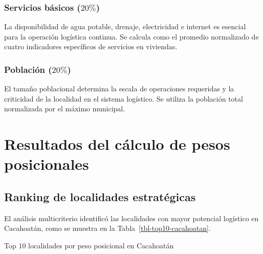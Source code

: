 \documentclass[
  spanish,
  us-letterpaper,
]{scrreprt}
\numberwithin{equation}{section}
\begin{document}
\subsubsection{\texorpdfstring{Servicios básicos
(\(20\%\))}{Servicios básicos (20\textbackslash\%)}}\label{servicios-buxe1sicos-20}

La disponibilidad de agua potable, drenaje, electricidad e internet es
esencial para la operación logística continua. Se calcula como el
promedio normalizado de cuatro indicadores específicos de servicios en
viviendas.

\subsubsection{\texorpdfstring{Población
(\(20\%\))}{Población (20\textbackslash\%)}}\label{poblaciuxf3n-20}

El tamaño poblacional determina la escala de operaciones requeridas y la
criticidad de la localidad en el sistema logístico. Se utiliza la
población total normalizada por el máximo municipal.

\section{Resultados del cálculo de pesos
posicionales}\label{resultados-del-cuxe1lculo-de-pesos-posicionales}

\subsection{Ranking de localidades
estratégicas}\label{ranking-de-localidades-estratuxe9gicas}

El análisis multicriterio identificó las localidades con mayor potencial
logístico en Cacahoatán, como se muestra en la
Tabla~\ref{tbl-top10-cacahoatan}.

Top \(10\) localidades por peso posicional en Cacahoatán
\end{document}
